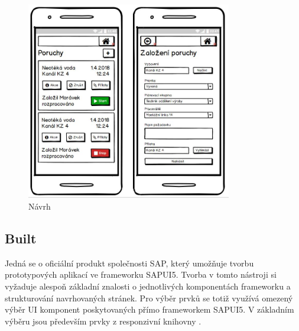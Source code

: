 \documentclass[thesis=M,czech]{FITthesis}[2012/06/26]
\begin{document}
\begin{figure}[H]
	\centering
	\includegraphics[width=0.8\textwidth]{images/bal_poruchy_mob}
	\caption{Návrh }
	\label{img:bal_poruchy_mob}
\end{figure}

\subsection{Built}
Jedná se o oficiální produkt společnosti SAP, který umožňuje tvorbu prototypových aplikací ve frameworku SAPUI5. Tvorba v tomto nástroji si vyžaduje alespoň základní znalosti o jednotlivých komponentách frameworku a strukturování navrhovaných stránek. Pro výběr prvků se totiž využívá omezený výběr UI komponent poskytovaných přímo frameworkem SAPUI5. V základním výběru jsou především prvky z responzivní knihovny .
\end{document}

